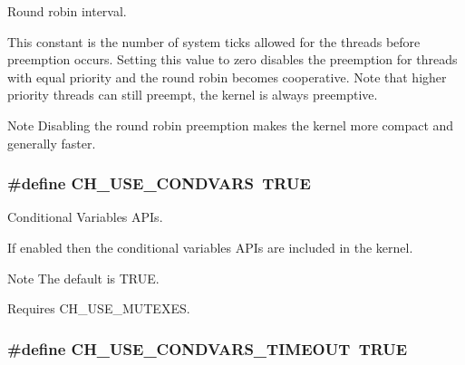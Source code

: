 Round robin interval. 

This constant is the number of system ticks allowed for the threads before preemption occurs. Setting this value to zero disables the preemption for threads with equal priority and the round robin becomes cooperative. Note that higher priority threads can still preempt, the kernel is always preemptive.

\begin{DoxyNote}{Note}
Disabling the round robin preemption makes the kernel more compact and generally faster. 
\end{DoxyNote}
\hypertarget{group__config_ga24fd7fe539fd6094b5db3215e1721c9c}{}
\subsubsection[{C\+H\+\_\+\+U\+S\+E\+\_\+\+C\+O\+N\+D\+V\+A\+R\+S}]{\setlength{\rightskip}{0pt plus 5cm}\#define C\+H\+\_\+\+U\+S\+E\+\_\+\+C\+O\+N\+D\+V\+A\+R\+S~T\+R\+U\+E}\label{group__config_ga24fd7fe539fd6094b5db3215e1721c9c}


Conditional Variables A\+P\+Is. 

If enabled then the conditional variables A\+P\+Is are included in the kernel.

\begin{DoxyNote}{Note}
The default is {\ttfamily T\+R\+U\+E}. 

Requires {\ttfamily C\+H\+\_\+\+U\+S\+E\+\_\+\+M\+U\+T\+E\+X\+E\+S}. 
\end{DoxyNote}
\hypertarget{group__config_gaccc2c032c409bced696f75877e270979}{}
\subsubsection[{C\+H\+\_\+\+U\+S\+E\+\_\+\+C\+O\+N\+D\+V\+A\+R\+S\+\_\+\+T\+I\+M\+E\+O\+U\+T}]{\setlength{\rightskip}{0pt plus 5cm}\#define C\+H\+\_\+\+U\+S\+E\+\_\+\+C\+O\+N\+D\+V\+A\+R\+S\+\_\+\+T\+I\+M\+E\+O\+U\+T~T\+R\+U\+E}\label{group__config_gaccc2c032c409bced696f75877e270979}


